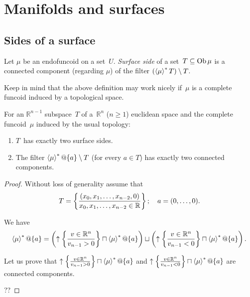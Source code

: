 \chapter{Manifolds and surfaces}

\section{Sides of a surface}


\begin{defn}
Let $\mu$ be an endofuncoid on a set~$U$.
\emph{Surface side} of a set~$T\subseteq\operatorname{Ob}\mu$ is a connected component
(regarding $\mu$) of the filter $(\left\langle \mu\right\rangle ^{\ast}T)\setminus T$.
\end{defn}

Keep in mind that the above definition may work nicely if~$\mu$ is
a complete funcoid induced by a topological space.

\begin{example}
For an $\mathbb{R}^{n-1}$ subspace~$T$ of a~$\mathbb{R}^n$ ($n\geq 1$)
euclidean space and the complete funcoid~$\mu$ induced by the usual topology:
\begin{enumerate}
\item $T$~has exactly two surface sides.
\item The filter $\left\langle \mu\right\rangle ^{\ast}@\{a\} \setminus T$ (for every $a\in T$)
  has exactly two connected components.
\end{enumerate}
\end{example}

\begin{proof}
Without loss of generality assume that
\[ T=\left\{ \frac{(x_0,x_1,\dots,x_{n-2},0)}{
x_0,x_1,\dots,x_{n-2}\in\mathbb{R}}\right\};
\quad
a = (0,\dots,0). \]

We have
\[ \left\langle \mu\right\rangle ^{\ast}@\{a\} =
\left(\uparrow\left\{ \frac{v\in\mathbb{R}^n}{v_{n-1}>0}\right\}\sqcap\left\langle \mu\right\rangle ^{\ast}@\{a\}\right)
\sqcup
\left(\uparrow\left\{ \frac{v\in\mathbb{R}^n}{v_{n-1}<0}\right\}\sqcap\left\langle \mu\right\rangle ^{\ast}@\{a\}\right). \]

Let us prove that
$\uparrow\left\{ \frac{v\in\mathbb{R}^n}{v_{n-1}>0}\right\}\sqcap\left\langle \mu\right\rangle ^{\ast}@\{a\}$ and
$\uparrow\left\{ \frac{v\in\mathbb{R}^n}{v_{n-1}<0}\right\}\sqcap\left\langle \mu\right\rangle ^{\ast}@\{a\}$ are
connected components.

??
\end{proof}

